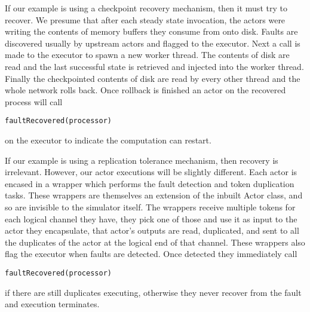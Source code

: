 If our example is using a checkpoint recovery mechanism, then it must try to recover.
We presume that after each steady state invocation, the actors were writing the contents of memory buffers they consume from onto disk.
Faults are discovered usually by upstream actors and flagged to the executor.
Next a call is made to the executor to spawn a new worker thread.
The contents of disk are read and the last successful state is retrieved and injected into the worker thread.
Finally the checkpointed contents of disk are read by every other thread and the whole network rolls back.
Once rollback is finished an actor on the recovered process will call \begin{verbatim}faultRecovered(processor)\end{verbatim} on the executor to indicate the computation can restart.

If our example is using a replication tolerance mechanism, then recovery is irrelevant.
However, our actor executions will be slightly different.
Each actor is encased in a wrapper which performs the fault detection and token duplication tasks.
These wrappers are themselves an extension of the inbuilt Actor class, and so are invisible to the simulator itself.
The wrappers receive multiple tokens for each logical channel they have, they pick one of those and use it as input to the actor they encapsulate, that actor's outputs are read, duplicated, and sent to all the duplicates of the actor at the logical end of that channel.
These wrappers also flag the executor when faults are detected.
Once detected they immediately call \begin{verbatim}faultRecovered(processor)\end{verbatim} if there are still duplicates executing, otherwise they never recover from the fault and execution terminates.